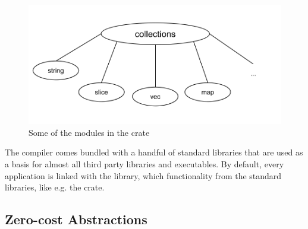 \begin{figure}[H]
  \begin{center}
    \includegraphics[scale=0.3]{figures/background/rust/libcollections.png}
  \end{center}
  \caption{Some of the modules in the  crate}
  \label{fig:rust:collections}
\end{figure}

The {\rust} compiler comes bundled with a handful of standard libraries that are used as a basis for almost all third party libraries and executables.
By default, every {\rust} application is linked with the {\rust} {\std} library, which  functionality from the standard libraries, like e.g. the  crate.
%

\subsection{Zero-cost Abstractions}
\label{chap:zero_cost_abstractions}

